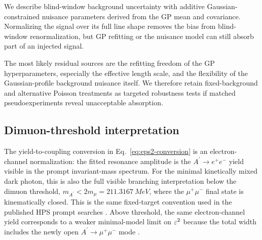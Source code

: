 We describe blind-window background uncertainty with additive Gaussian-constrained
nuisance parameters derived from the GP mean and covariance. Normalizing the signal
over its full line shape removes the bias from blind-window renormalization, but GP
refitting or the nuisance model can still absorb part of an injected signal.

The most likely residual sources are the refitting freedom of the GP hyperparameters,
especially the effective length scale, and the flexibility of the Gaussian-profile
background nuisance itself. We therefore retain fixed-background and alternative
Poisson treatments as targeted robustness tests if matched pseudoexperiments reveal
unacceptable absorption.

\subsection{Dimuon-threshold interpretation}
\label{sec:methodology-dimuon-threshold}

The yield-to-coupling conversion in Eq.~\eqref{eq:eps2-conversion} is an
electron-channel normalization: the fitted resonance amplitude is the
$A^\prime\to e^+e^-$ yield visible in the prompt invariant-mass spectrum. For the
minimal kinetically mixed dark photon, this is also the full visible branching
interpretation below the dimuon threshold, $m_{A^\prime}<2m_\mu=\SI{211.3167}{MeV}$,
where the $\mu^+\mu^-$ final state is kinematically closed. This is the same
fixed-target convention used in the published HPS prompt searches
\cite{EssigEtAl2011,HPS2015DarkPhoton,HPS2016PromptLong}. Above threshold, the same
electron-channel yield corresponds to a weaker minimal-model limit on $\varepsilon^2$ because
the total width includes the newly open $A^\prime\to\mu^+\mu^-$ mode
\cite{Holdom1986,Fabbrichesi2020DarkPhoton}.

